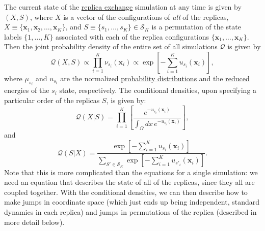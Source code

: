 \documentclass[9pt,review]{livecoms}
\newcommand{\vx}{\mathbf{x}}
\begin{document}
The current state of the \hyperlink{ref:ReplEx} {replica exchange} simulation at any time is given by $(X,S)$, where $X$ is a vector of the configurations of \emph{all} of the replicas, $X \equiv \{\vx_1, \vx_2, \ldots, \vx_K\}$, and $S \equiv\{s_1,\ldots,s_K\} \in \mathcal{S}_K$ is a permutation of the state labels $\{1, \ldots, K\}$ associated with each of the replica configurations $\{\vx_1, \ldots, \vx_K\}$. Then the joint probability density of the entire set of all simulations $\mathcal{Q}$ is given by
\begin{equation}
\mathcal{Q}(X, S) \propto \prod_{i=1}^{K} \nu_{s_i}(\vx_i) \propto \exp\left[-\sum_{i=1}^K u_{s_i}(\vx_i)\right],
\label{eq:parallereplica}
\end{equation}
where $\mu_{s_i}$ and $u_{s_i}$ are the normalized \hyperlink{ref:Distribution}{probability distributions} and the \hyperlink{ref:reduced}{reduced} energies of the $s_i$ state, respectively.
The conditional densities, upon specifying a particular order of the replicas $S$, is given by:
\begin{equation}
\mathcal{Q}(X | S) = \prod_{i=1}^K \left[ \frac{e^{-u_{s_i}(\vx_i)}}{\int_\Omega dx \, e^{-u_{s_i}(\vx_i)}}\right],
\end{equation}
and
\begin{equation}
\mathcal{Q}(S | X) = \frac{\exp\left[- \sum\limits_{i=1}^K u_{s_i}(\vx_i) \right]}{\sum\limits_{S' \in \mathcal{S}_K} \exp\left[- \sum\limits_{i=1}^K u_{s'_i}(\vx_i) \right]}.
\end{equation}
Note that this is more complicated than the equations for a single simulation: we need an equation that describes the state of all of the replicas, since they all are coupled together. With the conditional densities, we can then describe how to make jumps in coordinate space (which just ends up being independent, standard dynamics in each replica) and jumps in permutations of the replica (described in more detail below).
\end{document}
